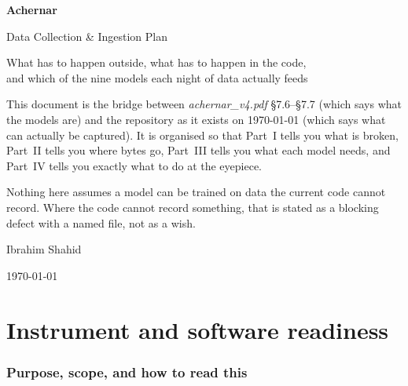 \documentclass[11pt]{article}
\begin{document}
\begin{titlepage}
\centering
\vspace*{2.2cm}
{\Huge\bfseries\color{acnavy} Achernar\par}
\vspace{0.5cm}
{\LARGE\color{acblue} Data Collection \& Ingestion Plan\par}
\vspace{0.4cm}
{\large\color{acgray} What has to happen outside, what has to happen in the code,\\
and which of the nine models each night of data actually feeds\par}
\vspace{1.6cm}

\begin{minipage}{0.82\textwidth}
\begin{keybox}
\small
This document is the bridge between \emph{achernar\_v4.pdf} \S7.6--\S7.7 (which
says what the models are) and the repository as it exists on
\today{} (which says what can actually be captured). It is organised so that
Part~I tells you what is broken, Part~II tells you where bytes go, Part~III
tells you what each model needs, and Part~IV tells you exactly what to do at
the eyepiece.

Nothing here assumes a model can be trained on data the current code cannot
record. Where the code cannot record something, that is stated as a blocking
defect with a named file, not as a wish.
\end{keybox}
\end{minipage}

\vfill
{\large\color{acnavy} Ibrahim Shahid\par}
{\small\color{acgray}\today\par}
\end{titlepage}

\tableofcontents
\newpage

\part{Instrument and software readiness}

\section{Purpose, scope, and how to read this}
\end{document}
